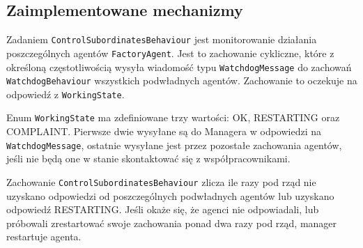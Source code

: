 \subsection{Zaimplementowane mechanizmy}
Zadaniem \texttt{ControlSubordinatesBehaviour} jest monitorowanie działania poszczególnych agentów \texttt{FactoryAgent}. Jest to zachowanie cykliczne, które z określoną częstotliwością wysyła wiadomość typu \texttt{WatchdogMessage} do zachowań \texttt{WatchdogBehaviour} wszystkich podwładnych agentów. Zachowanie to oczekuje na odpowiedź z \texttt{WorkingState}. 

Enum \texttt{WorkingState} ma zdefiniowane trzy wartości: OK, RESTARTING oraz COMPLAINT. Pierwsze dwie wysyłane są do Managera w odpowiedzi na \texttt{WatchdogMessage}, ostatnie wysyłane jest przez pozostałe zachowania agentów, jeśli nie będą one w stanie skontaktować się z współpracownikami.

Zachowanie \texttt{ControlSubordinatesBehaviour} zlicza ile razy pod rząd nie uzyskano odpowiedzi od poszczególnych podwładnych agentów lub uzyskano odpowiedź RESTARTING. Jeśli okaże się, że agenci nie odpowiadali, lub próbowali zrestartować swoje zachowania ponad dwa razy pod rząd, manager restartuje agenta.





